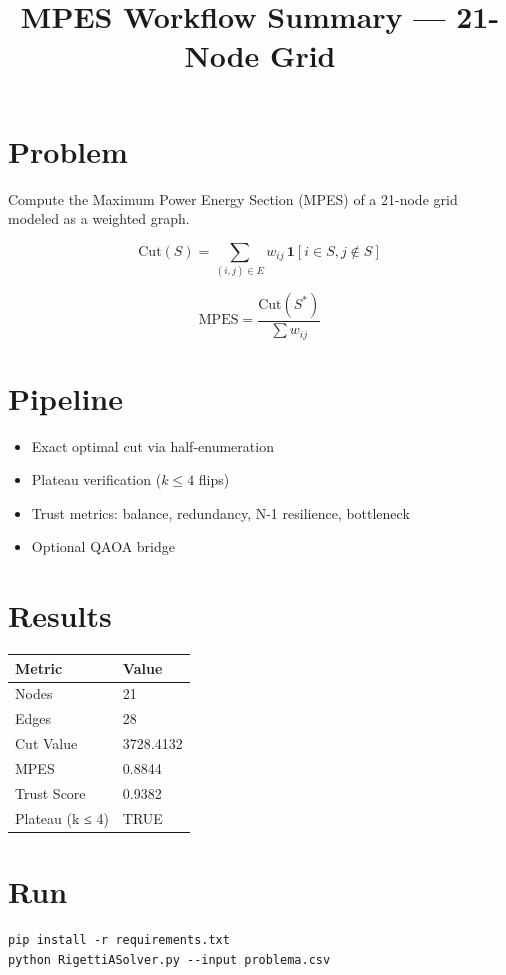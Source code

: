 \documentclass[10pt]{article}
\title{MPES Workflow Summary — 21-Node Grid}
\author{}
\date{}
\begin{document}
\maketitle

\section*{Problem}

Compute the Maximum Power Energy Section (MPES) of a 21-node grid modeled as a weighted graph.

\[
\text{Cut}(S) = \sum_{(i,j)\in E} w_{ij}\,\mathbf{1}[i \in S, j \notin S]
\]

\[
\text{MPES} = \frac{\text{Cut}(S^*)}{\sum w_{ij}}
\]

\section*{Pipeline}

\begin{itemize}
\item Exact optimal cut via half-enumeration
\item Plateau verification ($k \le 4$ flips)
\item Trust metrics: balance, redundancy, N-1 resilience, bottleneck
\item Optional QAOA bridge
\end{itemize}

\section*{Results}

\begin{tabular}{ll}
\toprule
Metric & Value \\
\midrule
Nodes & 21 \\
Edges & 28 \\
Cut Value & 3728.4132 \\
MPES & 0.8844 \\
Trust Score & 0.9382 \\
Plateau (k ≤ 4) & TRUE \\
\bottomrule
\end{tabular}

\section*{Run}

\begin{verbatim}
pip install -r requirements.txt
python RigettiASolver.py --input problema.csv
\end{verbatim}
\end{document}
